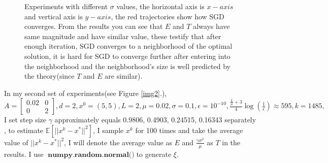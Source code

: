 \documentclass[12pt,a4paper]{article}
\DeclareMathOperator{\xyz}{\textbf{numpy.random.normal()}}
\begin{document}
\begin{figure}
	
	\caption{Experiments with different $\sigma$ values, the horizontal axis is $x-axis$ and vertical axis is $y-axis$, the red trajectories show how SGD converges. From the results you can see that $E$ and $T$ always have same magnitude and have similar value, these testify that after enough iteration, SGD  converges to a neighborhood of the optimal solution, it is hard for SGD to converge further after entering into the neighborhood and the neighborhood's size is well predicted by the theory(since $T$ and $E$ are similar). } %
	\label{img1}
\end{figure}



In my second set of experiments(see Figure \ref{img2}.), $A = \left [
\begin{array}{cc}
	0.02 & 0 \\
	0 & 2
\end{array}
\right ], d = 2, x^0 = (5,5), L = 2, \mu = 0.02, \sigma = 0.1, \epsilon = 10^{-10}, \frac{\frac{L}{\mu}+3}{4}\log(\frac{1}{\epsilon})\approx 595, k=1485, $  I set  step size $\gamma$ approximately equals 0.9806, 0.4903, 0.24515, 0.16343 separately , to estimate $\mathbb{E}\left[||x^k-x^*||^2\right]$, I sample $x^k$ for 100 times and take the average value of $||x^k-x^*||^2$, I will denote the average value as $E$ and $\frac{\gamma\sigma^2}{\mu}$ as $T$ in the results. I use $\xyz$to generate $\xi.$
\end{document}

